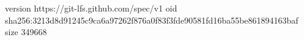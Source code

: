version https://git-lfs.github.com/spec/v1
oid sha256:3213d8d91245c9ca6a97262f876a0f83f3fde90581fd16ba55be861894163baf
size 349668
